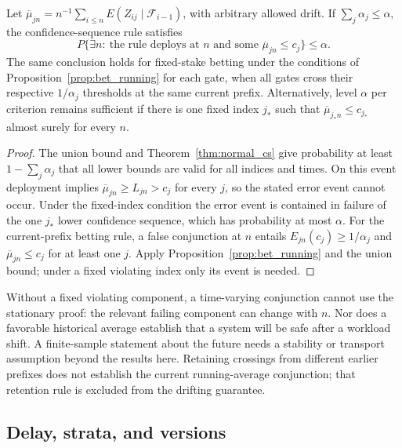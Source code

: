 \begin{theorem}
\label{thm:drift_gate}
Let $\overline\mu_{jn}=n^{-1}\sum_{i\leq n}
E(Z_{ij}\mid\mathcal F_{i-1})$, with arbitrary allowed drift.
If $\sum_j\alpha_j\leq\alpha$, the confidence-sequence rule satisfies
\[
P\{\exists n:\ \text{the rule deploys at }n
          \text{ and some }\overline\mu_{jn}\leq c_j\}\leq\alpha.
\]
The same conclusion holds for fixed-stake betting under the conditions
of Proposition~\ref{prop:bet_running} for each gate, when all gates cross
their respective $1/\alpha_j$ thresholds at the same current prefix.
Alternatively, level $\alpha$ per criterion remains sufficient if
there is one fixed index $j_*$ such that
$\overline\mu_{j_*n}\leq c_{j_*}$ almost surely for every $n$.
\end{theorem}
\begin{proof}
The union bound and Theorem~\ref{thm:normal_cs} give probability at least
$1-\sum_j\alpha_j$ that all lower bounds are valid for all indices and
times. On this event deployment implies
$\overline\mu_{jn}\geq L_{jn}>c_j$ for every $j$, so the stated error
event cannot occur. Under the fixed-index condition the error event
is contained in failure of the one $j_*$ lower confidence sequence,
which has probability at most $\alpha$.
For the current-prefix betting rule, a false conjunction at $n$ entails
$E_{jn}(c_j)\geq1/\alpha_j$ and $\overline\mu_{jn}\leq c_j$ for
at least one $j$. Apply Proposition~\ref{prop:bet_running} and the union
bound; under a fixed violating index only its event is needed.
\end{proof}

Without a fixed violating component, a time-varying conjunction cannot
use the stationary proof: the relevant failing component can change
with $n$. Nor does a favorable historical average establish that a system
will be safe after a workload shift. A finite-sample statement about the
future needs a stability or transport assumption beyond the results here.
Retaining crossings from different earlier prefixes does not establish
the current running-average conjunction; that retention rule is excluded
from the drifting guarantee.

\subsection{Delay, strata, and versions}


